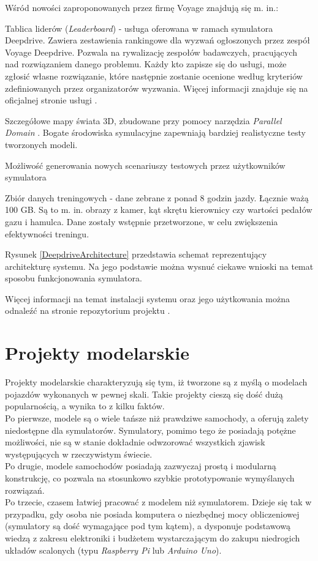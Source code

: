 Wśród nowości zaproponowanych przez firmę Voyage znajdują się m. in.:
\begin{itemize*}
\item Tablica liderów (\textit{Leaderboard}) - usługa oferowana w ramach symulatora Deepdrive. Zawiera zestawienia rankingowe dla wyzwań ogłoszonych przez zespół Voyage Deepdrive. Pozwala na rywalizację zespołów badawczych, pracujących nad rozwiązaniem danego problemu. Każdy kto zapisze się do usługi, może zgłosić własne rozwiązanie, które następnie zostanie ocenione według kryteriów zdefiniowanych przez organizatorów wyzwania. Więcej informacji znajduje się na oficjalnej stronie usługi \cite{deepdrive:leaderboard}.
\item Szczegółowe mapy świata 3D, zbudowane przy pomocy narzędzia \textit{Parallel Domain} \cite{parallelDomain}. Bogate środowiska symulacyjne zapewniają bardziej realistyczne testy tworzonych modeli.
\item Możliwość generowania nowych scenariuszy testowych przez użytkowników symulatora
\item Zbiór danych treningowych - dane zebrane z ponad 8 godzin jazdy. Łącznie ważą 100 GB. Są to m. in. obrazy z kamer, kąt skrętu kierownicy czy wartości pedałów gazu i hamulca. Dane zostały wstępnie przetworzone, w celu zwiększenia efektywności treningu.
\end{itemize*}

Rysunek \ref{DeepdriveArchitecture} przedstawia schemat reprezentujący architekturę systemu. Na jego podstawie można wysnuć ciekawe wnioski na temat sposobu funkcjonowania symulatora.

Więcej informacji na temat instalacji systemu oraz jego użytkowania można odnaleźć na stronie repozytorium projektu \cite{deepdrive:github}.

\section{Projekty modelarskie}
Projekty modelarskie charakteryzują się tym, iż tworzone są z myślą o modelach pojazdów wykonanych w pewnej skali. Takie projekty cieszą się dość dużą popularnością, a wynika to z kilku faktów. \\
Po pierwsze, modele są o wiele tańsze niż prawdziwe samochody, a oferują zalety niedostępne dla symulatorów. Symulatory, pomimo tego że posiadają potężne możliwości, nie są w stanie dokładnie odwzorować wszystkich zjawisk występujących w rzeczywistym świecie. \\
Po drugie, modele samochodów posiadają zazwyczaj prostą i modularną konstrukcję, co pozwala na stosunkowo szybkie prototypowanie wymyślanych rozwiązań. \\
Po trzecie, czasem łatwiej pracować z modelem niż symulatorem. Dzieje się tak w przypadku, gdy osoba nie posiada komputera o niezbędnej mocy obliczeniowej (symulatory są dość wymagające pod tym kątem), a dysponuje podstawową wiedzą z zakresu elektroniki i budżetem wystarczającym do zakupu niedrogich układów scalonych (typu \textit{Raspberry Pi} lub \textit{Arduino Uno}).

